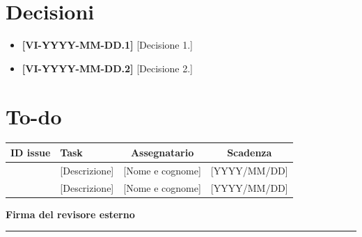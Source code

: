 \documentclass[11pt, a4paper]{article}
\begin{document}
\section{Decisioni}
\begin{itemize}
    \item \textbf{[VI-YYYY-MM-DD.1]} [Decisione 1.]
    \item \textbf{[VI-YYYY-MM-DD.2]} [Decisione 2.]
\end{itemize}

\section{To-do}
\begin{table}[h]
    \centering
    \renewcommand{\arraystretch}{1.5}
    \begin{tabularx}{\textwidth}{|c|X|c|c|}
        \hline
        \rowcolor{gray!10} 
        \textbf{ID issue} & 
        \textbf{Task} & 
        \textbf{Assegnatario} & 
        \textbf{Scadenza} \\
        \hline
        [- o \#numero] & [Descrizione] & [Nome e cognome] & [YYYY/MM/DD] \\
        \hline
        [- o \#numero] & [Descrizione] & [Nome e cognome] & [YYYY/MM/DD] \\
        \hline
    \end{tabularx}
\end{table}

\vfill

\hfill
\begin{minipage}{0.4\textwidth}
    \centering
    \textbf{Firma del revisore esterno}\par
    \vspace{1.5cm}
    \rule{\textwidth}{0.4pt} %
\end{minipage}

\vspace{2cm} 
\end{document}

